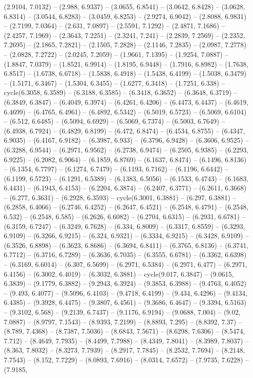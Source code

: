 (2.9104, 7.0132) -- (2.988, 6.9337) -- (3.0655, 6.8541) -- (3.0642, 6.8428) -- (3.0628, 6.8314) -- (3.0544, 6.8283) -- (3.0459, 6.8253) -- (2.9274, 6.9042) -- (2.8088, 6.9831) -- (2.7199, 7.0364) -- (2.631, 7.0897) -- (2.5591, 7.1292) -- (2.4871, 7.1686) -- (2.4257, 7.1969) -- (2.3643, 7.2251) -- (2.3241, 7.241) -- (2.2839, 7.2569) -- (2.2352, 7.2695) -- (2.1865, 7.2821) -- (2.1505, 7.2828) -- (2.1146, 7.2835) -- (2.0987, 7.2778) -- (2.0828, 7.2722) -- (2.0245, 7.2059) -- (1.9661, 7.1395) -- (1.9254, 7.0887) -- (1.8847, 7.0379) -- (1.8521, 6.9914) -- (1.8195, 6.9448) -- (1.7916, 6.8982) -- (1.7638, 6.8517) -- (1.6738, 6.6718) -- (1.5838, 6.4918) -- (1.5438, 6.4199) -- (1.5038, 6.3479) -- (1.5171, 6.3467) -- (1.5304, 6.3455) -- (1.6277, 6.3418) -- (1.7251, 6.338) -- cycle(6.3058, 6.3589) -- (6.3188, 6.3585) -- (6.3418, 6.3652) -- (6.3648, 6.3719) -- (6.3849, 6.3847) -- (6.4049, 6.3974) -- (6.4261, 6.4206) -- (6.4473, 6.4437) -- (6.4619, 6.4699) -- (6.4765, 6.4961) -- (6.4892, 6.5342) -- (6.5019, 6.5723) -- (6.5069, 6.6104) -- (6.512, 6.6485) -- (6.5094, 6.6929) -- (6.5069, 6.7374) -- (6.5003, 6.7649) -- (6.4938, 6.7924) -- (6.4829, 6.8199) -- (6.472, 6.8474) -- (6.4534, 6.8755) -- (6.4347, 6.9035) -- (6.4167, 6.9182) -- (6.3987, 6.933) -- (6.3796, 6.9428) -- (6.3606, 6.9525) -- (6.3288, 6.9544) -- (6.2971, 6.9562) -- (6.2738, 6.9474) -- (6.2505, 6.9385) -- (6.2293, 6.9225) -- (6.2082, 6.9064) -- (6.1859, 6.8769) -- (6.1637, 6.8474) -- (6.1496, 6.8136) -- (6.1354, 6.7797) -- (6.1274, 6.7479) -- (6.1193, 6.7162) -- (6.1196, 6.6442) -- (6.1199, 6.5723) -- (6.1291, 6.5389) -- (6.1383, 6.5056) -- (6.1533, 6.4743) -- (6.1683, 6.4431) -- (6.1943, 6.4153) -- (6.2204, 6.3874) -- (6.2407, 6.3771) -- (6.2611, 6.3668) -- (6.277, 6.3631) -- (6.2928, 6.3593) -- cycle(6.3001, 6.3881) -- (6.297, 6.3881) -- (6.2858, 6.4066) -- (6.2746, 6.4252) -- (6.2647, 6.4521) -- (6.2548, 6.4791) -- (6.2548, 6.532) -- (6.2548, 6.585) -- (6.2626, 6.6082) -- (6.2704, 6.6315) -- (6.2931, 6.6781) -- (6.3159, 6.7247) -- (6.3249, 6.7628) -- (6.334, 6.8009) -- (6.3317, 6.8559) -- (6.3293, 6.9109) -- (6.3266, 6.9215) -- (6.324, 6.9321) -- (6.3334, 6.9215) -- (6.3428, 6.9109) -- (6.3526, 6.8898) -- (6.3623, 6.8686) -- (6.3694, 6.8411) -- (6.3765, 6.8136) -- (6.3741, 6.7712) -- (6.3716, 6.7289) -- (6.3636, 6.7035) -- (6.3555, 6.6781) -- (6.3362, 6.6398) -- (6.3169, 6.6014) -- (6.307, 6.5699) -- (6.2971, 6.5384) -- (6.2971, 6.477) -- (6.2971, 6.4156) -- (6.3002, 6.4019) -- (6.3032, 6.3881) -- cycle(9.017, 6.3847) -- (9.0615, 6.3839) -- (9.1779, 6.3882) -- (9.2943, 6.3924) -- (9.3853, 6.3988) -- (9.4763, 6.4052) -- (9.493, 6.4077) -- (9.5096, 6.4103) -- (9.4718, 6.4199) -- (9.434, 6.4296) -- (9.4134, 6.4385) -- (9.3928, 6.4475) -- (9.3807, 6.4561) -- (9.3686, 6.4647) -- (9.3394, 6.5163) -- (9.3102, 6.568) -- (9.2139, 6.7437) -- (9.1176, 6.9194) -- (9.0688, 7.004) -- (9.02, 7.0887) -- (8.9797, 7.1543) -- (8.9393, 7.2199) -- (8.8893, 7.295) -- (8.8392, 7.37) -- (8.789, 7.4368) -- (8.7387, 7.5036) -- (8.6843, 7.5671) -- (8.6298, 7.6306) -- (8.5474, 7.712) -- (8.4649, 7.7935) -- (8.4499, 7.7988) -- (8.4349, 7.8041) -- (8.3989, 7.8037) -- (8.363, 7.8032) -- (8.3273, 7.7939) -- (8.2917, 7.7845) -- (8.2532, 7.7694) -- (8.2148, 7.7543) -- (8.152, 7.7229) -- (8.0893, 7.6916) -- (8.0314, 7.6572) -- (7.9735, 7.6228) -- (7.9185, 